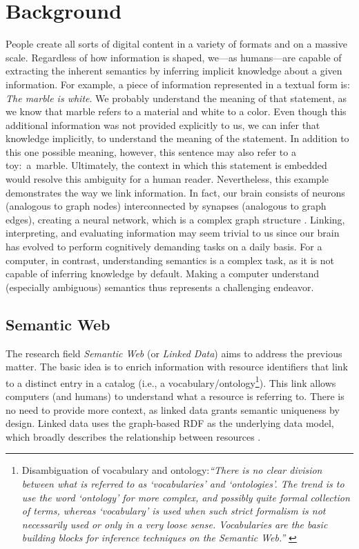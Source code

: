 \chapter{Background}\label{ch:Background}

People create all sorts of digital content in a variety of formats and on a massive scale. Regardless of how information is shaped, we—as humans—are capable of extracting the inherent semantics by inferring implicit knowledge about a given information. For example, a piece of information represented in a textual form is: \textit{The marble is white}. We probably understand the meaning of that statement, as we know that marble refers to a material and white to a color. Even though this additional information was not provided explicitly to us, we can infer that knowledge implicitly, to understand the meaning of the statement. In addition to this one possible meaning, however, this sentence may also refer to a toy:~a~marble. Ultimately, the context in which this statement is embedded would resolve this ambiguity for a human reader. Nevertheless, this example demonstrates the way we link information. In fact, our brain consists of neurons (analogous to graph nodes) interconnected by synapses (analogous to graph edges), creating a neural network, which is a complex graph structure \parencite[1]{Stanley2013}. Linking, interpreting, and evaluating information may seem trivial to us since our brain has evolved to perform cognitively demanding tasks on a daily basis. For a computer, in contrast, understanding semantics is a complex task, as it is not capable of inferring knowledge by default. Making a computer understand (especially ambiguous) semantics thus represents a  challenging endeavor. 


\section{Semantic Web}\label{sec:Semantic Web}

The research field \textit{Semantic Web} (or \textit{Linked Data}) aims to address the previous matter. The basic idea is to enrich information with resource identifiers that link to a distinct entry in a catalog (i.e., a vocabulary/ontology\footnote{Disambiguation of vocabulary and ontology:\enspace{}\textit{``There is no clear division between what is referred to as `vocabularies' and `ontologies'. The trend is to use the word `ontology' for more complex, and possibly quite formal collection of terms, whereas `vocabulary' is used when such strict formalism is not necessarily used or only in a very loose sense. Vocabularies are the basic building blocks for inference techniques on the Semantic Web.''} \parencite{W3COntologies}}). This link allows computers (and humans) to understand what a resource is referring to. There is no need to provide more context, as linked data grants semantic uniqueness by design. Linked data uses the graph-based \acrfull*{RDF} as the underlying data model, which broadly describes the relationship between resources \mbox{\parencite{RDF1997}.}

